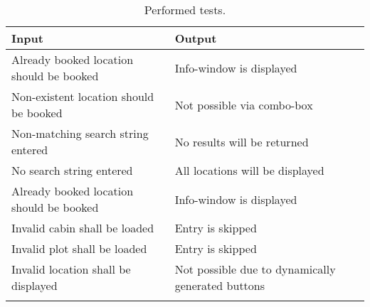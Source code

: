 \begin{longtable}{X X}
\hline Input & Output \\
\hline 
\hline Already booked location should be booked & Info-window is displayed \\
\hline Non-existent location should be booked & Not possible via combo-box \\
\hline Non-matching search string entered & No results will be returned \\
\hline No search string entered & All locations will be displayed \\
\hline Already booked location should be booked & Info-window is displayed \\
\hline Invalid cabin shall be loaded & Entry is skipped \\
\hline Invalid plot shall be loaded & Entry is skipped \\
\hline Invalid location shall be displayed & Not possible due to dynamically generated buttons \\
\caption{Performed tests.}
\end{longtable}
